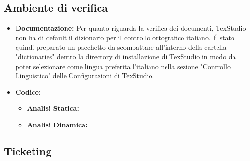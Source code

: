 \documentclass[NormeDiProgetto.tex]{subfiles}
\begin{document}
	\subsection{Ambiente di verifica}
	\begin{itemize}
		\item \textbf{Documentazione:} Per quanto riguarda la verifica dei documenti, TexStudio non
		ha di default il dizionario per il controllo ortografico italiano. \'{E}
		stato quindi preparato un pacchetto da scompattare all'interno della cartella
		"dictionaries" dentro la directory di installazione di TexStudio in modo da
		poter selezionare come lingua preferita l'italiano nella sezione "Controllo
		Linguistico" delle Configurazioni di TexStudio.
		\item \textbf{Codice:}
		\begin{itemize}
			\item \textbf{Analisi Statica:}
			\item \textbf{Analisi Dinamica:}
		\end{itemize}
	\end{itemize}
	\subsection{Ticketing}
	
\end{document}

